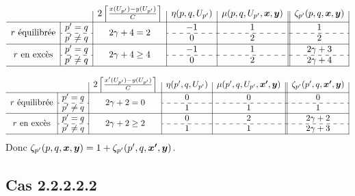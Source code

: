 \begin{gather*}
  \begin{array}{c|c|c|c|c||c|}
    \multicolumn{2}{c|}{}
    & 2 \left\lceil \frac{x(U_{p'})-y(U_{p'})}{C} \right\rceil
    & \eta(p,q,U_{p'})
    & \mu(p,q,U_{p'},\bs{x},\bs{y})
    & \zeta_{p'}(p,q,\bs{x},\bs{y})
    \\ \hline
    \multirow{2}{*}{$r$ équilibrée}
    & p'=q
    & \multirow{2}{*}{$2\gamma+4=2$}
    & -1
    & 1
    & 1
    \\ \cdashline{2-2}\cdashline{4-6}
    & p' \ne q
    &
    & 0
    & 2
    & 2
    \\ \hline
    \multirow{2}{*}{$r$ en excès}
    & p'=q
    & \multirow{2}{*}{$2\gamma+4 \ge 4$}
    & -1
    & 1
    & 2\gamma+3
    \\ \cdashline{2-2}\cdashline{4-6}
    & p' \ne q
    &
    & 0
    & 2
    & 2\gamma+4
    \\ \hline
  \end{array}
\end{gather*}

\begin{gather*}
  \begin{array}{c|c|c|c|c||c|}
    \multicolumn{2}{c|}{}
    & 2 \left\lceil \frac{x'(U_{p'})-y(U_{p'})}{C} \right\rceil
    & \eta(p',q,U_{p'})
    & \mu(p',q,U_{p'},\bs{x'},\bs{y})
    & \zeta_{p'}(p',q,\bs{x'},\bs{y})
    \\ \hline
    \multirow{2}{*}{$r$ équilibrée}
    & p'=q
    & \multirow{2}{*}{$2\gamma+2=0$}
    & 0
    & 0
    & 0
    \\ \cdashline{2-2}\cdashline{4-6}
    & p' \ne q
    &
    & 1
    & 1
    & 1
    \\ \hline
    \multirow{2}{*}{$r$ en excès}
    & p'=q
    & \multirow{2}{*}{$2\gamma+2 \ge 2$}
    & 0
    & 2
    & 2\gamma+2
    \\ \cdashline{2-2}\cdashline{4-6}
    & p' \ne q
    &
    & 1
    & 1
    & 2\gamma+3
    \\ \hline
  \end{array}
\end{gather*}
Donc $\zeta_{p'}(p,q,\boldsymbol{x},\boldsymbol{y}) = 1 + \zeta_{p'}(p',q,\boldsymbol{x'},\boldsymbol{y})$.

\subsection*{Cas 2.2.2.2.2}

